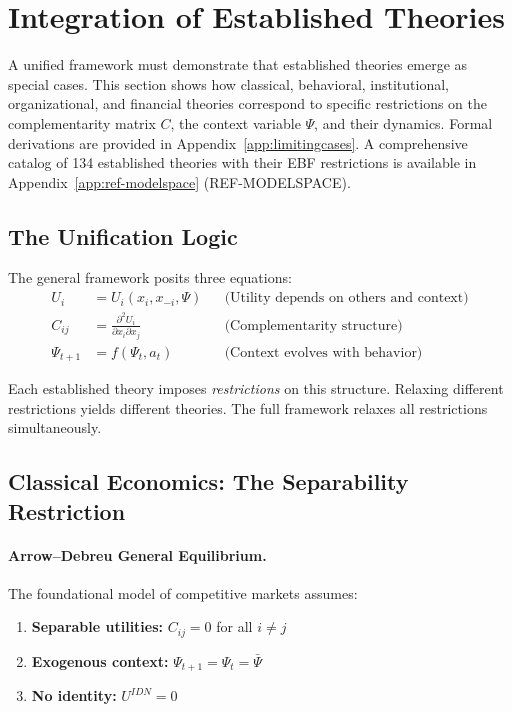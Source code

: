 \section{Integration of Established Theories}
\label{sec:integration}

A unified framework must demonstrate that established theories emerge as special cases.
This section shows how classical, behavioral, institutional, organizational, and financial
theories correspond to specific restrictions on the complementarity matrix $C$,
the context variable $\Psi$, and their dynamics.
Formal derivations are provided in Appendix~\ref{app:limitingcases}.
A comprehensive catalog of 134 established theories with their EBF restrictions
is available in Appendix~\ref{app:ref-modelspace} (REF-MODELSPACE).

\subsection{The Unification Logic}

The general framework posits three equations:
\begin{align}
  U_i &= U_i(x_i, x_{-i}, \Psi) && \text{(Utility depends on others and context)} \\
  C_{ij} &= \frac{\partial^2 U_i}{\partial x_i \partial x_j} && \text{(Complementarity structure)} \\
  \Psi_{t+1} &= f(\Psi_t, a_t) && \text{(Context evolves with behavior)}
\end{align}

Each established theory imposes \emph{restrictions} on this structure.
Relaxing different restrictions yields different theories.
The full framework relaxes all restrictions simultaneously.

\subsection{Classical Economics: The Separability Restriction}

\paragraph{Arrow--Debreu General Equilibrium.}
The foundational model of competitive markets \citep{arrowdeb} assumes:
\begin{enumerate}
  \item \textbf{Separable utilities:} $C_{ij} = 0$ for all $i \neq j$
  \item \textbf{Exogenous context:} $\Psi_{t+1} = \Psi_t = \bar{\Psi}$
  \item \textbf{No identity:} $U^{IDN} = 0$
\end{enumerate}

